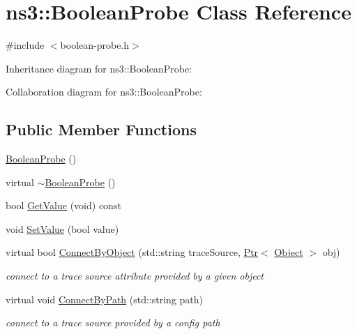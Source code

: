 \hypertarget{classns3_1_1BooleanProbe}{}\section{ns3\+:\+:Boolean\+Probe Class Reference}
\label{classns3_1_1BooleanProbe}


{\ttfamily \#include $<$boolean-\/probe.\+h$>$}



Inheritance diagram for ns3\+:\+:Boolean\+Probe\+:


Collaboration diagram for ns3\+:\+:Boolean\+Probe\+:
\subsection*{Public Member Functions}
\begin{DoxyCompactItemize}
\item 
\hyperlink{classns3_1_1BooleanProbe_a696d5dbba6d7d44fad0efa9056dfd201}{Boolean\+Probe} ()
\item 
virtual \hyperlink{classns3_1_1BooleanProbe_a879e0a11960c407feb7204f548b6f3d0}{$\sim$\+Boolean\+Probe} ()
\item 
bool \hyperlink{classns3_1_1BooleanProbe_a5f3d4d720de233e2913ceb1bcf324405}{Get\+Value} (void) const 
\item 
void \hyperlink{classns3_1_1BooleanProbe_a8569838d493c7f4871c6207270fc2621}{Set\+Value} (bool value)
\item 
virtual bool \hyperlink{classns3_1_1BooleanProbe_ad5a3da511dcd332c0fd1cddeadf8fd5d}{Connect\+By\+Object} (std\+::string trace\+Source, \hyperlink{classns3_1_1Ptr}{Ptr}$<$ \hyperlink{classns3_1_1Object}{Object} $>$ obj)
\begin{DoxyCompactList}\small\item\em connect to a trace source attribute provided by a given object \end{DoxyCompactList}\item 
virtual void \hyperlink{classns3_1_1BooleanProbe_af6e8114003bfeacefb0a45168d470d79}{Connect\+By\+Path} (std\+::string path)
\begin{DoxyCompactList}\small\item\em connect to a trace source provided by a config path \end{DoxyCompactList}\end{DoxyCompactItemize}
